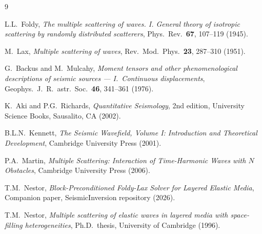 \documentclass[11pt,a4paper]{article}
\theoremstyle{plain}
\theoremstyle{definition}
\theoremstyle{remark}
\begin{document}
\begin{thebibliography}{9}

L.L.~Foldy,
\emph{The multiple scattering of waves.  I.  General theory of isotropic
scattering by randomly distributed scatterers},
Phys.\ Rev.\ \textbf{67}, 107--119 (1945).

M.~Lax,
\emph{Multiple scattering of waves},
Rev.\ Mod.\ Phys.\ \textbf{23}, 287--310 (1951).

G.~Backus and M.~Mulcahy,
\emph{Moment tensors and other phenomenological descriptions of seismic
sources --- I.\ Continuous displacements},
Geophys.\ J.\ R.\ astr.\ Soc.\ \textbf{46}, 341--361 (1976).

K.~Aki and P.G.~Richards,
\emph{Quantitative Seismology}, 2nd edition,
University Science Books, Sausalito, CA (2002).

B.L.N.~Kennett,
\emph{The Seismic Wavefield, Volume I: Introduction and Theoretical
Development},
Cambridge University Press (2001).

P.A.~Martin,
\emph{Multiple Scattering: Interaction of Time-Harmonic Waves with
$N$ Obstacles},
Cambridge University Press (2006).

T.M.~Nestor,
\emph{Block-Preconditioned Foldy-Lax Solver for Layered Elastic Media},
Companion paper, SeismicInversion repository (2026).

T.M.~Nestor,
\emph{Multiple scattering of elastic waves in layered media with
space-filling heterogeneities},
Ph.D.\ thesis, University of Cambridge (1996).

\end{thebibliography}
\end{document}
